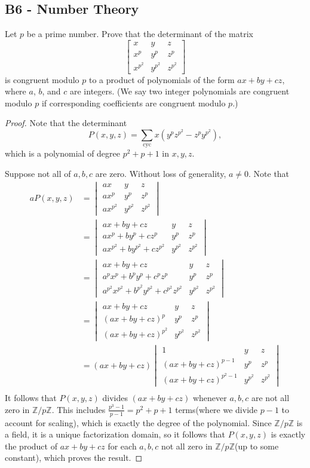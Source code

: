 \documentclass[11pt]{scrartcl}
\newcommand{\Z}{\mathbb{Z}}
\newcommand{\<}{\langle}
\renewcommand{\>}{\rangle}
\begin{document}
\subsection{B6 - Number Theory}
Let $p$ be a prime number. Prove that the determinant of the matrix\[ \begin{bmatrix}x & y & z\\ x^p & y^p & z^p \\ x^{p^2} & y^{p^2} & z^{p^2} \end{bmatrix} \]is congruent modulo $p$ to a product of polynomials of the form $ax+by+cz$, where $a$, $b$, and $c$ are integers. (We say two integer polynomials are congruent modulo $p$ if corresponding coefficients are congruent modulo $p$.)
\begin{proof}
Note that the determinant $$P(x, y, z) = \sum_{\text{cyc}}x(y^pz^{p^2} - z^py^{p^2}),$$
which is a polynomial of degree $p^2 + p + 1$ in $x, y, z$.

Suppose not all of $a, b, c$ are zero.  Without loss of generality, $a \ne 0$.  Note that 
\begin{align*}
aP(x, y, z) &= \begin{vmatrix}
ax & y & z\\ ax^p & y^p & z^p \\ ax^{p^2} & y^{p^2} & z^{p^2}
\end{vmatrix} \\
&=  \begin{vmatrix}
ax +by + cz & y & z\\ ax^p +by^p + cz^p & y^p & z^p \\ ax^{p^2} +by^{p^2} + cz^{p^2} & y^{p^2} & z^{p^2}
\end{vmatrix} \\
&=  \begin{vmatrix}
ax +by + cz & y & z\\ a^px^p +b^py^p + c^pz^p & y^p & z^p \\ a^{p^2}x^{p^2} +b^{p^2}y^{p^2} + c^{p^2}z^{p^2} & y^{p^2} & z^{p^2}
\end{vmatrix} \\
&= \begin{vmatrix}
ax +by + cz & y & z\\ (ax +by + cz )^p & y^p & z^p \\ (ax +by + cz )^{p^2} & y^{p^2} & z^{p^2}
\end{vmatrix} \\
&= (ax+by+cz) \begin{vmatrix}
1 & y & z\\ (ax +by + cz )^{p-1} & y^p & z^p \\ (ax +by + cz )^{p^2-1} & y^{p^2} & z^{p^2}
\end{vmatrix} \\
\end{align*}
It follows that $P(x, y, z)$ divides $(ax+by+cz)$ whenever $a, b, c$ are not all zero in $\Z/p\Z$.  This includes $\frac{p^3 - 1}{p-1} = p^2 + p + 1$ terms(where we divide $p-1$ to account for scaling), which is exactly the degree of the polynomial.  Since $\Z/p\Z$ is a field, it is a unique factorization domain, so it follows that $P(x,  y, z)$ is exactly the product of $ax+by+cz$ for each  $a, b, c$ not all zero in $\Z/p\Z$(up to some constant), which proves the result.  
\end{proof}
\end{document}
